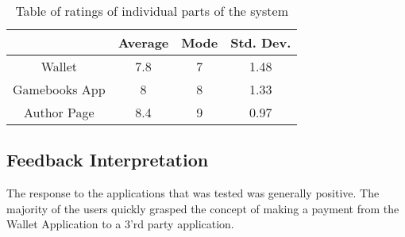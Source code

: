 \begin{table}
	\begin{center}
		\begin{tabular}	{ | c| c | c | c|}
		\hline
		 &Average & Mode & Std. Dev. \\ \hline
		 Wallet & 7.8 & 7 & 1.48 \\ \hline
		 Gamebooks App& 8 & 8 & 1.33\\ \hline
		 Author Page & 8.4 & 9 & 0.97\\ \hline

		
		
		\end{tabular}
		\caption{Table of ratings of individual parts of the system} 
		\label{tbl:ratings}
	\end{center}
\end{table}


\subsection{Feedback Interpretation}

The response to the applications that was tested was generally positive. The majority of the users quickly grasped the concept of making a payment from the Wallet Application to a 3'rd party application. 




